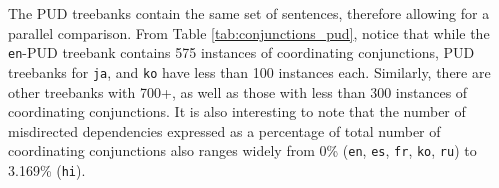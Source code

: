 The PUD treebanks contain the same set of sentences, therefore allowing for a parallel comparison. From Table \ref{tab:conjunctions_pud}, notice that while the \verb|en|-PUD treebank contains 575 instances of coordinating conjunctions, PUD treebanks for \verb|ja|, and \verb|ko| have less than 100 instances each. Similarly, there are other treebanks with 700+, as well as those with less than 300 instances of coordinating conjunctions. It is also interesting to note that the number of misdirected dependencies expressed as a percentage of total number of coordinating conjunctions also ranges widely from 0\% (\verb|en|, \verb|es|, \verb|fr|, \verb|ko|, \verb|ru|) to 3.169\% (\verb|hi|). 

\begin{table}[H]
{}
\end{table}
